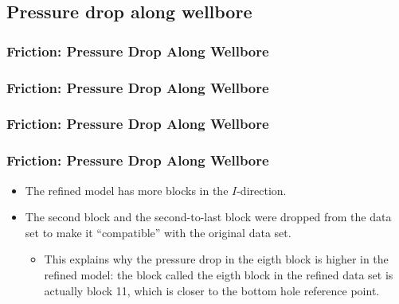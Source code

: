 \subsection{Pressure drop along wellbore}
\begin{frame}
    \frametitle{Friction: Pressure Drop Along Wellbore}
    \centerline{}
\end{frame}


\begin{frame}
    \frametitle{Friction: Pressure Drop Along Wellbore}
    \centerline{}
\end{frame}

\begin{frame}
    \frametitle{Friction: Pressure Drop Along Wellbore}
    \centerline{}
\end{frame}

\begin{frame}
    \frametitle{Friction: Pressure Drop Along Wellbore}
    \centerline{}
\end{frame}
\begin{frame}
    \begin{itemize}
        \item The refined model has more blocks in the $I$-direction.
        \item The second block and the second-to-last block were dropped from the data set to make it ``compatible'' with the original data set.
        \begin{itemize}
            \item This explains why the pressure drop in the eigth block is higher in the refined model: the block called the eigth block in the refined data set is actually block 11, which is closer to the bottom hole reference point.
        \end{itemize}
    \end{itemize}
\end{frame}

